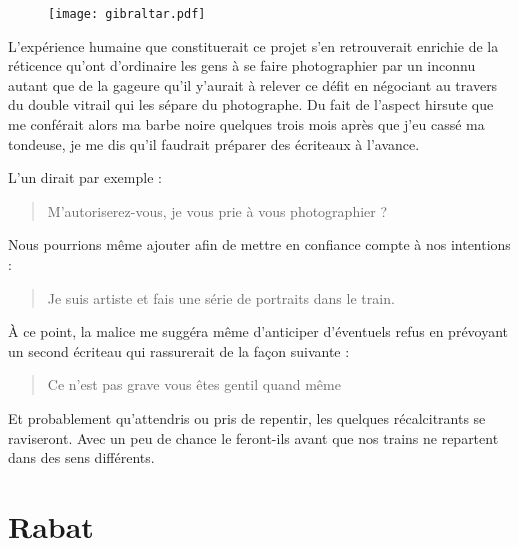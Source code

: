\begin{prose}
  \begin{figure}[h]
    \centering
    \texttt{[image: gibraltar.pdf]}
    \captionsetup{labelformat=empty}
    \caption[Idéotexte de  (\textarabic{جبل طارق})]{}
  \end{figure}


  L’expérience humaine que constituerait ce projet s’en retrouverait enrichie de la réticence qu’ont d’ordinaire les gens à se faire photographier par un inconnu autant que de la gageure qu’il y’aurait à relever ce défit en négociant au travers du double vitrail qui les sépare du photographe.
  Du fait de l’aspect hirsute que me conférait alors ma barbe noire quelques trois mois après que j’eu cassé ma tondeuse, je me dis qu’il faudrait préparer des écriteaux à l’avance.

  L’un dirait par exemple :

  \begin{quotation}
    M’autoriserez-vous, je vous prie à vous photographier ?
  \end{quotation}

  Nous pourrions même ajouter afin de mettre en confiance compte à nos intentions :
  \begin{quotation}
    Je suis artiste et fais une série de portraits dans le train.
  \end{quotation}

  À ce point, la malice me suggéra même d’anticiper d’éventuels refus en prévoyant un second écriteau qui rassurerait de la façon suivante :

  \begin{quotation}
    Ce n’est pas grave vous êtes gentil quand même 
  \end{quotation}

  Et probablement qu’attendris ou pris de repentir, les quelques récalcitrants se raviseront. Avec un peu de chance le feront-ils avant que nos trains ne repartent dans des sens différents.
\end{prose}

\section*{Rabat}

